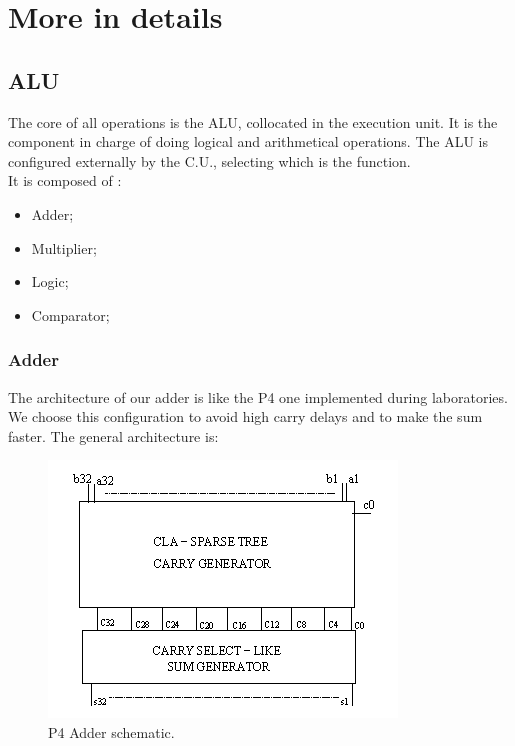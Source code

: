 %
\chapter{More in details}
\label{chap1}

\section{ALU}

The core of all operations is the ALU, collocated in the execution unit. It is the component in charge of doing logical
and arithmetical operations. The ALU is configured externally by the C.U., selecting which is the function.
\\It is composed of :

\begin{itemize}
\item Adder;
\item Multiplier;
\item Logic;
\item Comparator;
\end{itemize}

\subsection{Adder}

The architecture of our adder is like the P4 one implemented during laboratories. We choose this configuration to avoid high carry
delays and to make the sum faster. The general architecture is:

\begin{figure}[ht]
\centering
\includegraphics[]{chapters/figures/p4adder} 
\caption{P4 Adder schematic.}
\label{fig:adder}  %
\end{figure}

